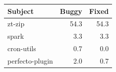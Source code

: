 \begin{tabular}{@{}lrr@{}}
\toprule
Subject & Buggy & Fixed \\
\midrule
zt-zip & 54.3 & 54.3 \\
spark & 3.3 & 3.3 \\
cron-utils & 0.7 & 0.0 \\
perfecto-plugin & 2.0 & 0.7 \\
\bottomrule
\end{tabular}
